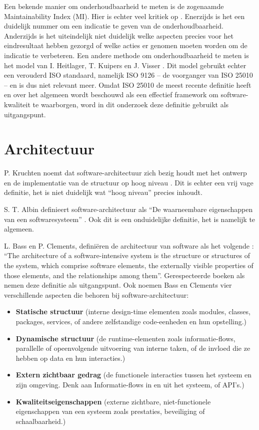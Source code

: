 Een bekende manier om onderhoudbaarheid te meten is de zogenaamde Maintainability Index (MI). Hier is echter veel kritiek op \parencite{MaintainabilityLiteratureReview, WhyNoMI, WhyNoMI2, MeasuringMaintainability}. Enerzijds is het een duidelijk nummer om een indicatie te geven van de onderhoudbaarheid. Anderzijds is het uiteindelijk niet duidelijk welke aspecten precies voor het eindresultaat hebben gezorgd of welke acties er genomen moeten worden om de indicatie te verbeteren. Een andere methode om onderhoudbaarheid te meten is het model van I. Heitlager, T. Kuipers en J. Visser \parencite{MeasuringMaintainability}. Dit model gebruikt echter een verouderd ISO standaard, namelijk ISO 9126 -- de voorganger van ISO 25010 -- en is dus niet relevant meer. Omdat ISO 25010 \parencite{ISO25010} de meest recente definitie heeft en over het algemeen wordt beschouwd als een effectief framework om software-kwaliteit te waarborgen, word in dit onderzoek deze definitie gebruikt als uitgangspunt.

\section{Architectuur}
P. Kruchten noemt dat software-architectuur zich bezig houdt met het ontwerp en de implementatie van de structuur op hoog niveau \parencite{4plus1}. Dit is echter een vrij vage definitie, het is niet duidelijk wat \enquote{hoog niveau} precies inhoudt.

S. T. Albin definieert software-architectuur als \enquote{De waarneembare eigenschappen van een softwaresysteem} \parencite{ArtOfArchitecture}. Ook dit is een onduidelijke definitie, het is namelijk te algemeen.

L. Bass en P. Clements, definiëren de architectuur van software als het volgende \parencite{ArchitectureInPractice}: \enquote{The architecture of a software-intensive system is the structure or structures of the system, which comprise software elements, the externally visible properties of those elements, and the relationships among them}. Gerespecteerde boeken als \parencite{ArchitectureStakeholders, DesigningArchitectures} nemen deze definitie als uitgangspunt. Ook noemen Bass en Clements vier verschillende aspecten die behoren bij software-architectuur:
\begin{itemize}
	\item \textbf{Statische structuur} (interne design-time elementen zoals modules, classes, packages, services, of andere zelfstandige code-eenheden en hun opstelling.)
	\item \textbf{Dynamische structuur} (de runtime-elementen zoals informatie-flows, parallelle of opeenvolgende uitvoering van interne taken, of de invloed die ze hebben op data en hun interacties.)
	\item \textbf{Extern zichtbaar gedrag} (de functionele interacties tussen het systeem en zijn omgeving. Denk aan Informatie-flows in en uit het systeem, of API's.)
	\item \textbf{Kwaliteitseigenschappen} (externe zichtbare, niet-functionele eigenschappen van een systeem zoals prestaties, beveiliging of schaalbaarheid.)
\end{itemize}

